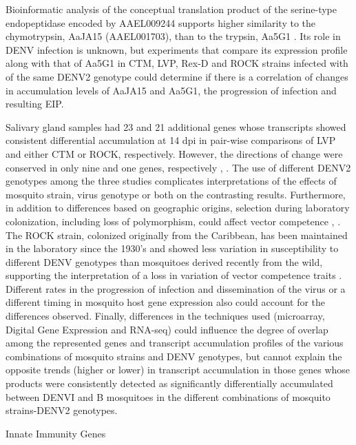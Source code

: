 Bioinformatic analysis of the conceptual translation product of the serine-type endopeptidase encoded by AAEL009244 supports higher similarity to the chymotrypsin, AaJA15 (AAEL001703), than to the trypsin, Aa5G1 \cite{Brackney2010}.
Its role in DENV infection is unknown, but experiments that compare its expression profile along with that of Aa5G1 in CTM, LVP, Rex-D and ROCK strains infected with of the same DENV2 genotype could determine if there is a correlation of changes in accumulation levels of AaJA15 and Aa5G1, the progression of infection and resulting EIP.

Salivary gland samples had 23 and 21 additional genes whose transcripts showed consistent differential accumulation at 14 dpi in pair-wise comparisons of LVP and either CTM or ROCK, respectively.
However, the directions of change were conserved in only nine and one genes, respectively \cite{Luplertlop2011}, \cite{Sim2012}.
The use of different DENV2 genotypes among the three studies complicates interpretations of the effects of mosquito strain, virus genotype or both on the contrasting results.
Furthermore, in addition to differences based on geographic origins, selection during laboratory colonization, including loss of polymorphism, could affect vector competence \cite{Wahlund1928}, \cite{Armstrong2001}.
The ROCK strain, colonized originally from the Caribbean, has been maintained in the laboratory since the 1930’s \cite{Kuno2010} and showed less variation in susceptibility to different DENV genotypes than mosquitoes derived recently from the wild, supporting the interpretation of a loss in variation of vector competence traits \cite{Armstrong2001}.
Different rates in the progression of infection and dissemination of the virus or a different timing in mosquito host gene expression also could account for the differences observed.
Finally, differences in the techniques used (microarray, Digital Gene Expression and RNA-seq) could influence the degree of overlap among the represented genes and transcript accumulation profiles of the various combinations of mosquito strains and DENV genotypes, but cannot explain the opposite trends (higher or lower) in transcript accumulation in those genes whose products were consistently detected as significantly differentially accumulated between DENVI and B mosquitoes in the different combinations of mosquito strains-DENV2 genotypes.

Innate Immunity Genes

